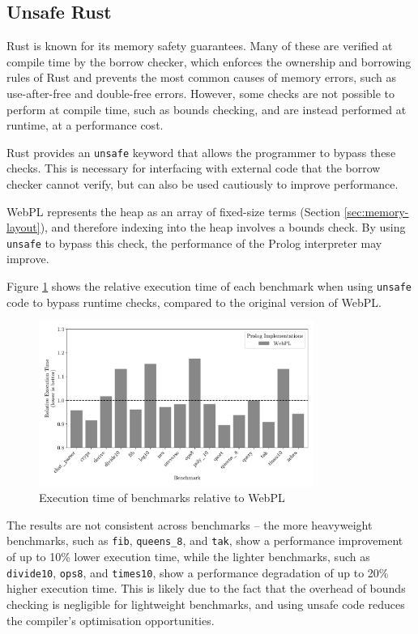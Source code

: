 \subsection{Unsafe Rust}

Rust is known for its memory safety guarantees. Many of these are verified at compile time by the borrow checker, which enforces the ownership and borrowing rules of Rust and prevents the most common causes of memory errors, such as use-after-free and double-free errors. However, some checks are not possible to perform at compile time, such as bounds checking, and are instead performed at runtime, at a performance cost.

Rust provides an \texttt{unsafe} keyword that allows the programmer to bypass these checks. This is necessary for interfacing with external code that the borrow checker cannot verify, but can also be used cautiously to improve performance.

WebPL represents the heap as an array of fixed-size terms (Section \ref{sec:memory-layout}), and therefore indexing into the heap involves a bounds check. By using \texttt{unsafe} to bypass this check, the performance of the Prolog interpreter may improve.

Figure \ref{fig:unsafe} shows the relative execution time of each benchmark when using \texttt{unsafe} code to bypass runtime checks, compared to the original version of WebPL.

\begin{figure}[H]
\centering
\includegraphics[width=0.8\textwidth]{relative_performance_unsafe.pdf}
\caption{Execution time of benchmarks relative to WebPL}
\label{fig:unsafe}
\end{figure}

The results are not consistent across benchmarks -- the more heavyweight benchmarks, such as \texttt{fib}, \texttt{queens\_8}, and \texttt{tak}, show a performance improvement of up to 10\% lower execution time, while the lighter benchmarks, such as \texttt{divide10}, \texttt{ops8}, and \texttt{times10}, show a performance degradation of up to 20\% higher execution time. This is likely due to the fact that the overhead of bounds checking is negligible for lightweight benchmarks, and using unsafe code reduces the compiler's optimisation opportunities.

